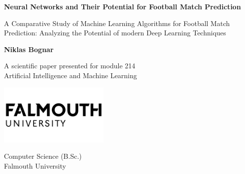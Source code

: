 \begin{titlepage}
    \begin{center}
        \vspace*{1cm}

        \Huge
        \textbf{Neural Networks and Their Potential for Football Match Prediction}

        \vspace{0.5cm}
        \LARGE
        A Comparative Study of Machine Learning Algorithms for Football Match Prediction: Analyzing the Potential of modern Deep Learning Techniques

        \vspace{1.5cm}

        \textbf{Niklas Bognar}

        \vfill

        A scientific paper presented for module 214\\
        Artificial Intelligence and Machine Learning

        \vspace{0.8cm}

        \includegraphics[width=0.4\textwidth]{images/falmouth-university-vector-logo}

        \Large
        Computer Science (B.Sc.)\\
        Falmouth University\\


    \end{center}
\end{titlepage}